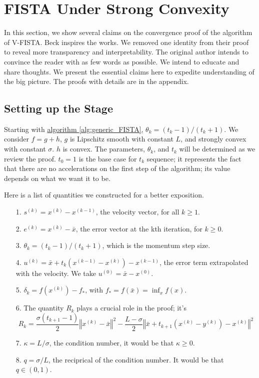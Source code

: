 \documentclass[]{article}
\theoremstyle{definition}
\numberwithin{equation}{subsection}
\begin{document}
\section{FISTA Under Strong Convexity}\label{sec:fista_strong_convexity}
    In this section, we show several claims on the convergence proof of the algorithm of V-FISTA. 
    Beck \cite[10.7.7]{beck_first-order_nodate} inspires the works. 
    We removed one identity from their proof to reveal more transparency and interpretability. 
    The original author intends to convince the reader with as few words as possible. 
    We intend to educate and share thoughts. 
    We present the essential claims here to expedite understanding of the big picture. 
    The proofs with details are in the appendix. 
    \subsection{Setting up the Stage}
        Starting with \hyperref[alg:generic_FISTA]{algorithm \ref*{alg:generic_FISTA}}, $\theta_k = (t_k - 1)/(t_k + 1)$. 
        We consider $f = g + h$, $g$ is Lipschitz smooth with constant $L$, and strongly convex with constant $\sigma$. 
        $h$ is convex. 
        The parameters, $\theta_k$, and $t_k$ will be determined as we review the proof. 
        $t_{0} = 1$ is the base case for $t_k$ sequence; it represents the fact that there are no accelerations on the first step of the algorithm; its value depends on what we want it to be. 
        \par
        Here is a list of quantities we constructed for a better exposition. 
        \begin{itemize}
            \item [1.] $s^{(k)} = x^{(k)} - x^{(k - 1)}$, the velocity vector,
            for all $k\ge 1$. 
            \item [2.] $e^{(k)} = x^{(k)} - \bar x$, the error vector at the kth iteration, for $k \ge 0$. 
            \item [3.] $\theta_k = (t_k -1)/(t_k + 1)$, which is the momentum step size. 
            \item [4.] $u^{(k)} = \bar x + t_{k}(x^{(k - 1)} - x^{(k)}) - x^{(k - 1)}$, the error term extrapolated with the velocity. We take $u^{(0)} = \bar x - x^{(0)}$. 
            \item [5.] $\delta_k = f(x^{(k)}) - f_*$, with $f_* = f(\bar x) = \inf_x f(x)$. 
            \item [6.] The quantity $R_k$ plays a crucial role in the proof; it's
            $$
                R_k = 
                \frac{\sigma(t_{k + 1} - 1)}{2}
                \left\Vert
                    x^{(k)} - \bar x
                \right\Vert^2 
                - 
                \frac{L - \sigma}{2}
                \left\Vert
                    \bar x + t_{k + 1}\left( x^{(k)} - y^{(k)}\right) - x^{(k)}
                \right\Vert^2
            $$
            \item [7.] $\kappa = L/\sigma$, the condition number, it would be that $\kappa \ge 0$. 
            \item [8.] $q = \sigma/L$, the reciprical of the condition number. It would be that $q \in (0, 1)$. 
        \end{itemize}
\end{document}
